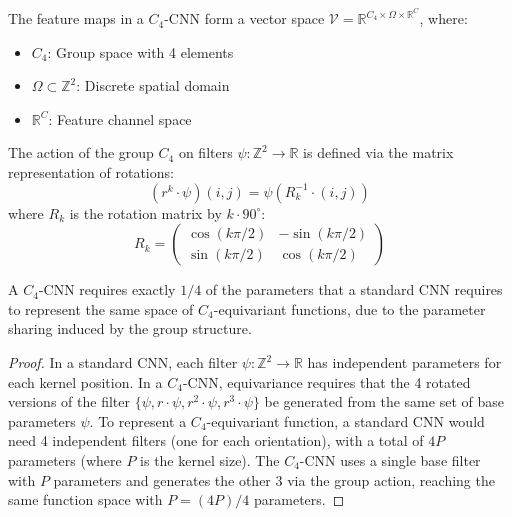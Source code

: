 The feature maps in a $C_4$-CNN form a vector space $\mathcal{V} = \mathbb{R}^{C_4 \times \Omega \times \mathbb{R}^C}$, where:
\begin{itemize}
    \item $C_4$: Group space with 4 elements
    \item $\Omega \subset \mathbb{Z}^2$: Discrete spatial domain
    \item $\mathbb{R}^C$: Feature channel space
\end{itemize}

\begin{definition}
The action of the group $C_4$ on filters $\psi: \mathbb{Z}^2 \to \mathbb{R}$ is defined via the matrix representation of rotations:
\begin{equation}
(r^k \cdot \psi)(i,j) = \psi(R_k^{-1} \cdot (i,j))
\end{equation}
where $R_k$ is the rotation matrix by $k \cdot 90^\circ$:
\begin{equation}
R_k = \begin{pmatrix}
\cos(k\pi/2) & -\sin(k\pi/2) \\
\sin(k\pi/2) & \cos(k\pi/2)
\end{pmatrix}
\end{equation}
\end{definition}

\begin{theorem}
A $C_4$-CNN requires exactly $1/4$ of the parameters that a standard CNN requires to represent the same space of $C_4$-equivariant functions, due to the parameter sharing induced by the group structure.
\end{theorem}

\begin{proof}
In a standard CNN, each filter $\psi: \mathbb{Z}^2 \to \mathbb{R}$ has independent parameters for each kernel position. In a $C_4$-CNN, equivariance requires that the 4 rotated versions of the filter $\{\psi, r \cdot \psi, r^2 \cdot \psi, r^3 \cdot \psi\}$ be generated from the same set of base parameters $\psi$. To represent a $C_4$-equivariant function, a standard CNN would need 4 independent filters (one for each orientation), with a total of $4P$ parameters (where $P$ is the kernel size). The $C_4$-CNN uses a single base filter with $P$ parameters and generates the other 3 via the group action, reaching the same function space with $P = (4P)/4$ parameters.
\end{proof}

